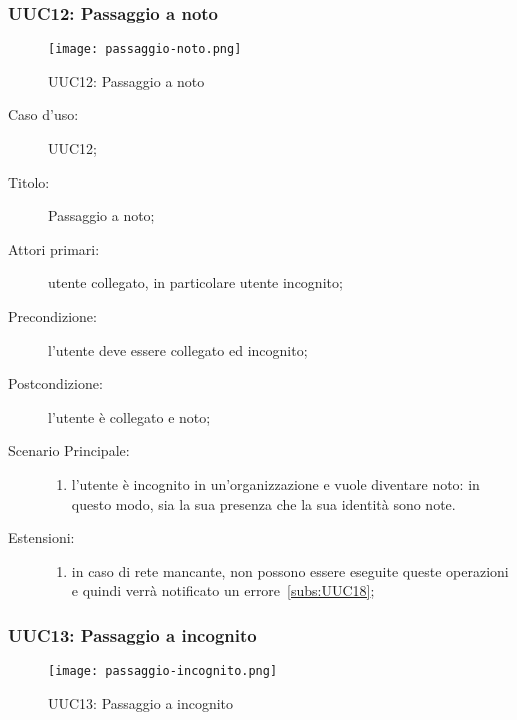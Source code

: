 \documentclass[../../../analisi-dei-requisiti.tex]{subfiles}
\begin{document}
\subsubsection{UUC12: Passaggio a noto}%
\label{subs:UUC12}

\begin{figure}[H]
  \centering
  \texttt{[image: passaggio-noto.png]}
  \caption{UUC12: Passaggio a noto}%
  \label{fig:UUC12}
\end{figure}

\begin{description}
  \item[Caso d'uso:] UUC12;
  \item[Titolo:] Passaggio a noto;
  \item[Attori primari:] utente collegato, in particolare utente incognito;
  \item[Precondizione:] l'utente deve essere collegato ed incognito;
  \item[Postcondizione:] l'utente è collegato e noto;
  \item[Scenario Principale:]
        \begin{enumerate}
          \item l'utente è incognito in un'organizzazione e vuole diventare noto: in questo modo, sia la sua presenza che la sua identità sono note.
        \end{enumerate}
  \item[Estensioni:]
        \begin{enumerate}
          \item in caso di rete mancante, non possono essere eseguite queste operazioni e quindi verrà notificato un errore~\ref{subs:UUC18};
        \end{enumerate}
\end{description}




\subsubsection{UUC13: Passaggio a incognito}%
\label{subs:UUC13}

\begin{figure}[H]
  \centering
  \texttt{[image: passaggio-incognito.png]}
  \caption{UUC13: Passaggio a incognito}%
  \label{fig:UUC13}
\end{figure}
\end{document}
